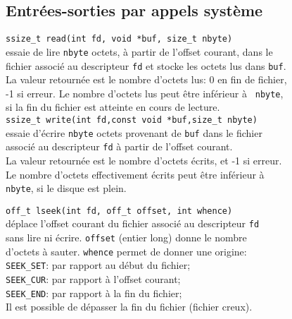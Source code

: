 \begin{frame}

    \section{Entr\'ees-sorties par appels syst\`eme}


{\tt ssize\_t read(int fd, void *buf, size\_t nbyte)}\\
essaie de lire {\tt nbyte} octets, \`a partir de l'offset courant, dans
le\\
 fichier associ\'e au descripteur {\tt fd} et stocke les octets lus dans
 {\tt buf}.\\
La valeur retourn\'ee est le nombre d'octets lus: 0 en fin de fichier,\\
-1 si erreur. Le nombre d'octets lus peut \^etre inf\'erieur \`a {\tt
  nbyte},\\
si la fin du fichier est atteinte en cours de lecture.\\

{\tt ssize\_t write(int fd,const void *buf,size\_t nbyte)}\\
essaie d'\'ecrire {\tt nbyte} octets provenant de {\tt buf} dans le
fichier\\
associ\'e au descripteur {\tt fd} \`a partir de l'offset courant.\\
La valeur retourn\'ee est le nombre d'octets \'ecrits, et -1 si erreur.\\
Le nombre d'octets effectivement \'ecrits peut \^etre inf\'erieur \`a\\
{\tt nbyte}, si le disque est plein.\\

\newpage

{\tt off\_t lseek(int fd, off\_t offset, int whence)}\\
d\'eplace l'offset courant du fichier associ\'e au descripteur {\tt fd} \\
sans lire ni \'ecrire. {\tt offset} (entier long) donne le nombre \\
d'octets \`a sauter. {\tt whence} permet de donner une origine: \\
\hspace*{5mm} {\tt SEEK\_SET}: par rapport au d\'ebut du fichier; \\
\hspace*{5mm} {\tt SEEK\_CUR}: par rapport \`a l'offset courant; \\
\hspace*{5mm} {\tt SEEK\_END}: par rapport \`a la fin du fichier;\\
Il est possible de d\'epasser la fin du fichier (fichier creux).\\



\end{frame}



